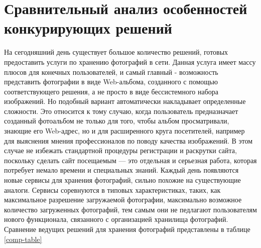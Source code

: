 \section{Сравнительный анализ особенностей конкурирующих решений} \label{literature}

На сегодняшний день существует большое количество решений, готовых предоставить услуги по хранению фотографий в сети.
Данная услуга имеет массу плюсов для конечных пользователей, и самый главный  - возможность представить фотографии в виде Web-альбома, созданного с помощью соответствующего решения, а не просто в виде бессистемного набора изображений.
Но подобный вариант автоматически накладывает определенные сложности. 
Это относится к тому случаю, когда пользователь предназначает созданный фотоальбом не только для того, чтобы альбом просматривали, знающие его Web-адрес, но и для расширенного круга посетителей, например для выяснения мнения профессионалов по поводу качества изображений.
В этом случае не избежать стандартной процедуры регистрации и раскрутки сайта, поскольку сделать сайт посещаемым — это отдельная и серьезная работа, которая потребует немало времени и специальных знаний.
Каждый день появляются новые сервисы для хранения фотографий, сильно похожие на существующие аналоги.
Сервисы соревнуются в типовых характеристиках, таких, как максимальное разрешение загружаемой фотографии, максимально возможное количество загруженных фотографий, тем самым они не педлагают пользователям нового функционала, связанного с организацией хранилища фотографий.
Сравнение ведущих решений для хранения фотографий представлены в таблице \ref{comp-table}

